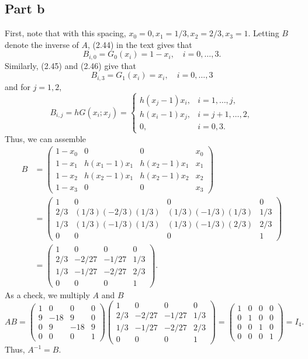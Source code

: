 \documentclass{article}
\begin{document}
\subsection{Part b}
First, note that with this spacing, $x_0=0,x_1=1/3,x_2=2/3,x_3=1$. Letting $B$ denote the inverse of $A$, (2.44) in the text gives that 
\[
B_{i,0}=G_0(x_i)=1-x_i, \quad i=0,\ldots,3.
\]
Similarly, (2.45) and (2.46) give that 
\[
B_{i,3}=G_1(x_i)=x_i, \quad i=0,\ldots,3
\]
and for $j=1,2$,
\[
B_{i,j}=hG(x_i;x_j)=\begin{cases}
h(x_j-1)x_i, &i=1,\ldots,j,\\
h(x_i-1)x_j, &i=j+1,\ldots,2,\\
0, &i=0,3.
\end{cases}
\]
Thus, we can assemble
\begin{align*}
B&=\begin{pmatrix}
1-x_0&0&0&x_0\\
1-x_1&h(x_1-1)x_1&h(x_2-1)x_1&x_1\\
1-x_2&h(x_2-1)x_1&h(x_2-1)x_2&x_2\\
1-x_3&0&0&x_3\end{pmatrix}\\&=
\begin{pmatrix}
1&0&0&0\\
2/3&(1/3)(-2/3)(1/3)&(1/3)(-1/3)(1/3)&1/3\\
1/3&(1/3)(-1/3)(1/3)&(1/3)(-1/3)(2/3)&2/3\\
0&0&0&1\end{pmatrix}\\&=
\begin{pmatrix}
1&0&0&0\\
2/3&-2/27&-1/27&1/3\\
1/3&-1/27&-2/27&2/3\\
0&0&0&1\end{pmatrix}.
\end{align*}
As a check, we multiply $A$ and $B$
\[
AB=\begin{pmatrix}
1&0&0&0\\
9&-18&9&0\\
0&9&-18&9\\
0&0&0&1\end{pmatrix}\begin{pmatrix}
1&0&0&0\\
2/3&-2/27&-1/27&1/3\\
1/3&-1/27&-2/27&2/3\\
0&0&0&1\end{pmatrix}=\begin{pmatrix}
1&0&0&0\\
0&1&0&0\\
0&0&1&0\\
0&0&0&1
\end{pmatrix}=I_4.
\]
Thus, $A^{-1}=B.$
\end{document}

